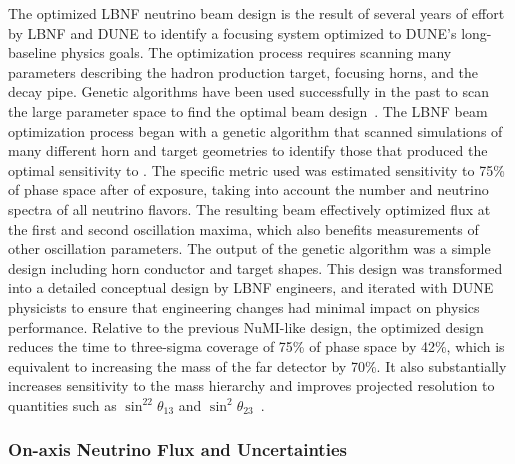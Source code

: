 The optimized LBNF neutrino beam design is the result of several years of effort by LBNF and DUNE to identify a focusing system optimized to DUNE's long-baseline physics goals.  The optimization process requires scanning many parameters describing the hadron production target, focusing horns, and the decay pipe. Genetic algorithms have been used successfully in the past to scan the large parameter space to find the optimal beam design~\cite{Calviani:2014cxa}. The  LBNF beam optimization process began with a genetic algorithm that scanned simulations of many different horn and target geometries to identify those that produced the optimal sensitivity to .  The specific metric used was estimated sensitivity to 75\% of  phase space after   %
of exposure, taking into account the number and neutrino spectra of all neutrino flavors. The resulting beam effectively optimized flux at the first and second oscillation maxima, which also benefits measurements of other oscillation parameters.  The output of the genetic algorithm was a simple design including horn conductor and target shapes.  This design was transformed into a detailed conceptual design by LBNF engineers, and iterated with DUNE physicists to ensure that engineering changes had minimal impact on physics performance.  Relative to the previous NuMI-like design, the optimized design reduces the time to three-sigma coverage of 75\% of  phase space by 42\%, which is equivalent to increasing the mass of the far detector by 70\%.  It also substantially increases sensitivity to the mass hierarchy and improves projected resolution to quantities such as $\sin^22\theta_{13}$ and $\sin^2\theta_{23}$~\cite{fields_doc_2901}.        

\subsubsection{On-axis Neutrino Flux and Uncertainties}


